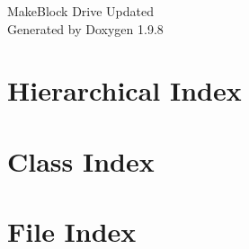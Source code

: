 \documentclass[twoside]{book}
\newcommand{\+}{\discretionary{\mbox{\scriptsize$\hookleftarrow$}}{}{}}
\newcommand{\clearemptydoublepage}{%
    \newpage{\pagestyle{empty}\cleardoublepage}%
  }
\begin{document}
  \raggedbottom
    \hypersetup{pageanchor=false,
                bookmarksnumbered=true,
                pdfencoding=unicode
               }
  \begin{titlepage}
  \vspace*{7cm}
  \begin{center}%
  {\Large Make\+Block Drive Updated}\\
  \vspace*{1cm}
  {\large Generated by Doxygen 1.9.8}\\
  \end{center}
  \end{titlepage}
  \clearemptydoublepage
  \tableofcontents
  \clearemptydoublepage
  \hypersetup{pageanchor=true}

\chapter{Hierarchical Index}

\chapter{Class Index}

\chapter{File Index}

\end{document}
